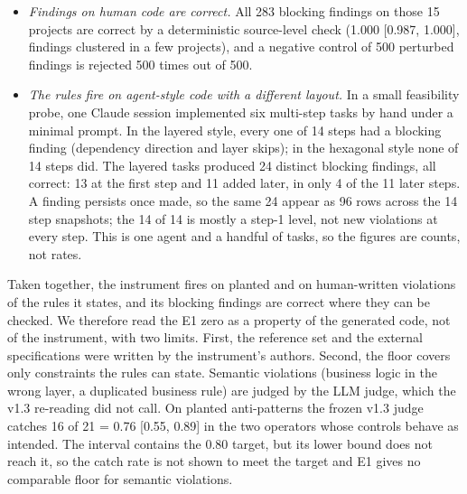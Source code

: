 \documentclass[10pt,a4paper]{article}
\begin{document}
\begin{itemize}
  \item \emph{Findings on human code are correct.} All 283 blocking findings on those 15 projects are correct by a
        deterministic source-level check (1.000 [0.987, 1.000], findings clustered in a few projects), and a negative
        control of 500 perturbed findings is rejected 500 times out of 500.
  \item \emph{The rules fire on agent-style code with a different layout.} In a small feasibility probe, one Claude
        session implemented six multi-step tasks by hand under a minimal prompt. In the layered style, every one of
        14 steps had a blocking finding (dependency direction and layer skips); in the hexagonal style none of 14
        steps did. The layered tasks produced 24 distinct blocking findings, all correct: 13 at the first step and 11
        added later, in only 4 of the 11 later steps. A finding persists once made, so the same 24 appear as 96 rows
        across the 14 step snapshots; the 14 of 14 is mostly a step-1 level, not new violations at every step. This is
        one agent and a handful of tasks, so the figures are counts, not rates.
\end{itemize}
Taken together, the instrument fires on planted and on human-written violations of the rules it states, and its
blocking findings are correct where they can be checked. We therefore read the E1 zero as a property of the generated
code, not of the instrument, with two limits. First, the reference set and the external specifications were written
by the instrument's authors. Second, the floor covers only constraints the rules can state. Semantic violations
(business logic in the wrong layer, a duplicated business rule) are judged by the LLM judge, which the v1.3 re-reading
did not call. On planted anti-patterns the frozen v1.3 judge catches 16 of 21 = 0.76 [0.55, 0.89] in the two operators
whose controls behave as intended. The interval contains the 0.80 target, but its lower bound does not reach it, so
the catch rate is not shown to meet the target and E1 gives no comparable
floor for semantic violations.
\end{document}
